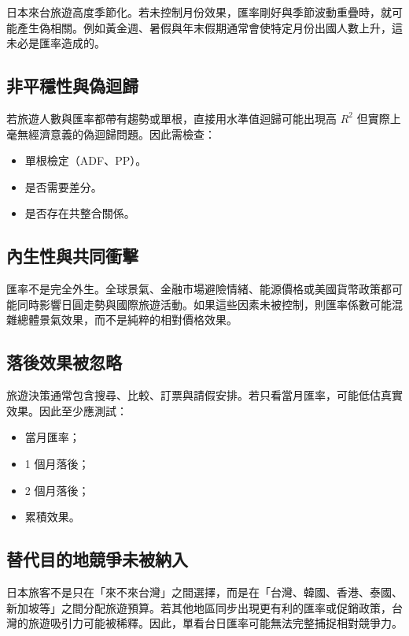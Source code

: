 \documentclass[12pt,a4paper,fontset=none]{ctexart}
\begin{document}
日本來台旅遊高度季節化。若未控制月份效果，匯率剛好與季節波動重疊時，就可能產生偽相關。例如黃金週、暑假與年末假期通常會使特定月份出國人數上升，這未必是匯率造成的。

\subsection{非平穩性與偽迴歸}

若旅遊人數與匯率都帶有趨勢或單根，直接用水準值迴歸可能出現高 $R^2$ 但實際上毫無經濟意義的偽迴歸問題。因此需檢查：

\begin{itemize}
  \item 單根檢定（ADF、PP）。
  \item 是否需要差分。
  \item 是否存在共整合關係。
\end{itemize}

\subsection{內生性與共同衝擊}

匯率不是完全外生。全球景氣、金融市場避險情緒、能源價格或美國貨幣政策都可能同時影響日圓走勢與國際旅遊活動。如果這些因素未被控制，則匯率係數可能混雜總體景氣效果，而不是純粹的相對價格效果。

\subsection{落後效果被忽略}

旅遊決策通常包含搜尋、比較、訂票與請假安排。若只看當月匯率，可能低估真實效果。因此至少應測試：

\begin{itemize}
  \item 當月匯率；
  \item 1 個月落後；
  \item 2 個月落後；
  \item 累積效果。
\end{itemize}

\subsection{替代目的地競爭未被納入}

日本旅客不是只在「來不來台灣」之間選擇，而是在「台灣、韓國、香港、泰國、新加坡等」之間分配旅遊預算。若其他地區同步出現更有利的匯率或促銷政策，台灣的旅遊吸引力可能被稀釋。因此，單看台日匯率可能無法完整捕捉相對競爭力。
\end{document}
